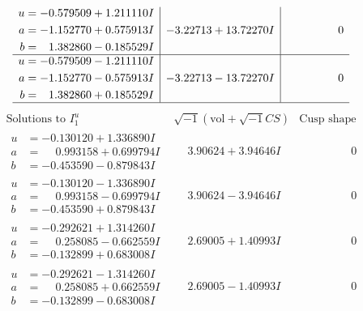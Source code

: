 \documentclass[1p]{elsarticle_modified}
\theoremstyle{definition}
\newcommand{\I}{\sqrt{-1}}
\begin{document}
$$\begin{array}{c|c|c}
\begin{aligned}
u &= -0.579509 + 1.211110 I \\
a &= -1.152770 + 0.575913 I \\
b &= \phantom{-}1.382860 - 0.185529 I\end{aligned}
 & -3.22713 + 13.72270 I & \phantom{-0.000000 } 0 \\ \hline\begin{aligned}
u &= -0.579509 - 1.211110 I \\
a &= -1.152770 - 0.575913 I \\
b &= \phantom{-}1.382860 + 0.185529 I\end{aligned}
 & -3.22713 - 13.72270 I & \phantom{-0.000000 } 0\\
 \hline 
 \end{array}$$\newpage$$\begin{array}{c|c|c}  
\text{Solutions to }I^u_{1}& \I (\text{vol} + \sqrt{-1}CS) & \text{Cusp shape}\\
 \hline 
\begin{aligned}
u &= -0.130120 + 1.336890 I \\
a &= \phantom{-}0.993158 + 0.699794 I \\
b &= -0.453590 - 0.879843 I\end{aligned}
 & \phantom{-}3.90624 + 3.94646 I & \phantom{-0.000000 } 0 \\ \hline\begin{aligned}
u &= -0.130120 - 1.336890 I \\
a &= \phantom{-}0.993158 - 0.699794 I \\
b &= -0.453590 + 0.879843 I\end{aligned}
 & \phantom{-}3.90624 - 3.94646 I & \phantom{-0.000000 } 0 \\ \hline\begin{aligned}
u &= -0.292621 + 1.314260 I \\
a &= \phantom{-}0.258085 - 0.662559 I \\
b &= -0.132899 + 0.683008 I\end{aligned}
 & \phantom{-}2.69005 + 1.40993 I & \phantom{-0.000000 } 0 \\ \hline\begin{aligned}
u &= -0.292621 - 1.314260 I \\
a &= \phantom{-}0.258085 + 0.662559 I \\
b &= -0.132899 - 0.683008 I\end{aligned}
 & \phantom{-}2.69005 - 1.40993 I & \phantom{-0.000000 } 0 \\ \hline\begin{aligned}

\end{aligned}
\end{array}$$
\end{document}
